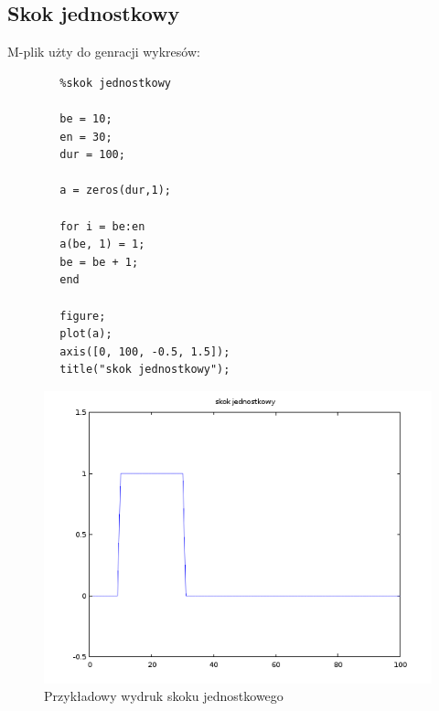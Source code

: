 \documentclass[12pt,titlepage]{report}
\begin{document}
\subsection{Skok jednostkowy}

M-plik użty do genracji wykresów:
\begin{multicols}{3}
	{
		\tiny
		\begin{verbatim}
		%skok jednostkowy
		
		be = 10;
		en = 30;
		dur = 100;
		
		a = zeros(dur,1);
		
		for i = be:en
		a(be, 1) = 1;
		be = be + 1;
		end
		
		figure;
		plot(a);
		axis([0, 100, -0.5, 1.5]);
		title("skok jednostkowy");
		\end{verbatim}
	}
\end{multicols}

\begin{figure}[!h]
	\centering
	\includegraphics[scale=0.5]{../cw04_output}
	\caption{Przykładowy wydruk skoku jednostkowego}
\end{figure}
\end{document}
